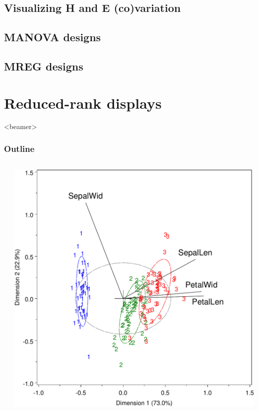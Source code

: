 \documentclass[10pt,t]{beamer}
\begin{document}
\subsection{Visualizing H and E (co)variation}

\subsection{MANOVA designs}

\subsection{MREG designs}


\section{Reduced-rank displays}
\begin{frame}<beamer>
  \frametitle{Outline}
	\begin{columns}[c]
	  \begin{column}{.6\textwidth}
	  \tableofcontents[currentsection]
	  \end{column}
	  \begin{column}{.4\textwidth}
	  \includegraphics[width=\textwidth]{fig/bipliris}
	  \end{column}
	\end{columns}
\end{frame}
\end{document}
